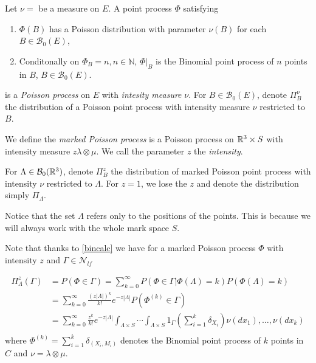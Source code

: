 


\begin{definition} Let $\nu=$ be a measure on $E$. A point process $\Phi$ satisfying
\begin{enumerate}
	\item $\Phi(B)$ has a Poisson distribution with parameter $\nu(B)$ for each $B\in \mathcal B_0(E)$,
	\item Conditonally on $\Phi_B=n, n\in\mathbb N$,  $\Phi|_B$ is the Binomial point process of $n$ points in $B$, $B \in \mathcal B_0(E)$.
\end{enumerate}
is a \textit{Poisson process} on $E$ with \textit{intesity measure} $\nu$.
For $B\in \mathcal B_0(E)$, denote $\Pi^\nu_B$ the distribution of a Poisson point process with intensity measure $\nu$ restricted to $B$.  
\end{definition}

\begin{definition}We define the \textit{marked Poisson process} is a Poisson process on ${\mathbb R^3}\times S$ with intensity measure $z\lambda \otimes \mu$. We call the parameter $z$ the \textit{intensity}.\newline


	For $\Lambda\in \mathcal B_0({\mathbb R^3})$, denote $\Pi^z_B$ the distribution of  marked Poisson point process with intensity $\nu$ restricted to $\Lambda$. For $z=1$, we lose the $z$ and denote the distribution simply $\Pi_\Lambda$.
\end{definition}
Notice that the set $\Lambda$ refers only to the positions of the points. This is because we will always work with the whole mark space $S$.


Note that thanks to \ref{bincalc} we have for a marked Poisson process $\Phi$ with intensity $z$ and $\Gamma \in \mathcal N_{lf}$ 

\begin{align}\label{eq:poiscalc}
	\Pi^z_\Lambda(\Gamma) &= P(\Phi \in \Gamma) = \sum^\infty_{k=0} P(\Phi \in \Gamma | \Phi(\Lambda) = k) P(\Phi(\Lambda)=k) \\
	& = \sum^\infty_{k=0} \frac{(z|\Lambda|)^k}{k!} e^{-z|\Lambda|} P(\Phi^{(k)}\in \Gamma)\\ 
	& = \sum^\infty_{k=0} \frac{z^k}{k!} e^{-z|\Lambda|} \int_{\Lambda\times S} \cdots \int_{\Lambda\times S} 1_{\Gamma} \left(\sum^k_{i=1} \delta_{X_i}\right) \nu(dx_1), \dots, \nu(dx_k)\\
\end{align}
where $\Phi^{(k)} = \sum^k_{i=1}\delta_{(X_i,M_i)}$ denotes the Binomial point process of $k$ points in $C$ and $\nu=\lambda \otimes \mu$. 

